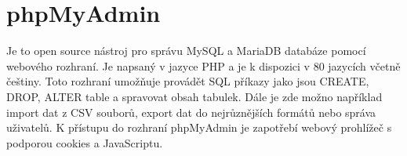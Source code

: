 \section{phpMyAdmin}

Je to open source nástroj pro správu MySQL a MariaDB databáze pomocí
webového rozhraní. Je napsaný v jazyce PHP a je k dispozici v 80
jazycích včetně češtiny. Toto rozhraní umožňuje provádět SQL příkazy
jako jsou CREATE, DROP, ALTER table a spravovat obsah tabulek. Dále je
zde možno například import dat z CSV souborů, export dat do
nejrůznějších formátů nebo správa uživatelů. K přístupu do rozhraní
phpMyAdmin je zapotřebí webový prohlížeč s podporou cookies a
JavaScriptu.




\textbf{}
\textit{}
